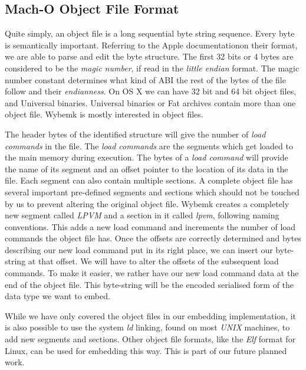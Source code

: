 \subsection{Mach-O Object File Format}

Quite simply, an object file is a long sequential byte string sequence. Every
byte is semantically important. Referring to the Apple
documentation\footnotemark on their format, we are able to parse and edit the
\macho byte structure. The first 32 bits or 4 bytes are considered to be the
\textit{magic number}, if read in the \textit{little endian} format. The magic
number constant determines what kind of ABI the rest of the bytes of the file
follow and their \textit{endianness}. On OS X we can have 32 bit and 64 bit
\macho object files, and Universal binaries. Universal binaries or Fat archives
contain more than one object file. Wybemk is mostly interested in \macho object
files.


The header bytes of the identified structure will give the number of
\textit{load commands} in the file. The \textit{load commands} are the segments
which get loaded to the main memory during execution. The bytes of a
\textit{load command} will provide the name of its segment and an offset
pointer to the location of its data in the file. Each segment can also contain
multiple sections. A complete object file has several important pre-defined
segments and sections which should not be touched by us to prevent altering the
original object file. Wybemk creates a completely new segment called
\textit{\textunderscore \textunderscore LPVM} and a section in it called
\textit{\textunderscore \textunderscore lpvm}, following naming
conventions. This adds a new load command and increments the number of load
commands the object file has. Once the offsets are correctly determined and
bytes describing our new load command put in its right place, we can insert our
byte-string at that offset. We will have to alter the offsets of the subsequent
load commands. To make it easier, we rather have our new load command data at
the end of the object file. This byte-string will be the encoded serialised
form of the data type we want to embed.

While we have only covered the \macho object files in our embedding
implementation, it is also possible to use the system \textit{ld} linking,
found on most \textit{UNIX} machines, to add new segments and sections. Other
object file formats, like the \textit{Elf} format for Linux, can be used for
embedding this way. This is part of our future planned work.

